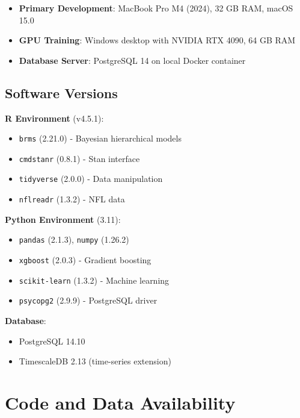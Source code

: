 \begin{itemize}
    \item \textbf{Primary Development}: MacBook Pro M4 (2024), 32 GB RAM, macOS 15.0
    \item \textbf{GPU Training}: Windows desktop with NVIDIA RTX 4090, 64 GB RAM
    \item \textbf{Database Server}: PostgreSQL 14 on local Docker container
\end{itemize}

\subsection{Software Versions}

\textbf{R Environment} (v4.5.1):
\begin{itemize}
    \item \texttt{brms} (2.21.0) - Bayesian hierarchical models
    \item \texttt{cmdstanr} (0.8.1) - Stan interface
    \item \texttt{tidyverse} (2.0.0) - Data manipulation
    \item \texttt{nflreadr} (1.3.2) - NFL data
\end{itemize}

\textbf{Python Environment} (3.11):
\begin{itemize}
    \item \texttt{pandas} (2.1.3), \texttt{numpy} (1.26.2)
    \item \texttt{xgboost} (2.0.3) - Gradient boosting
    \item \texttt{scikit-learn} (1.3.2) - Machine learning
    \item \texttt{psycopg2} (2.9.9) - PostgreSQL driver
\end{itemize}

\textbf{Database}:
\begin{itemize}
    \item PostgreSQL 14.10
    \item TimescaleDB 2.13 (time-series extension)
\end{itemize}

\section{Code and Data Availability}

